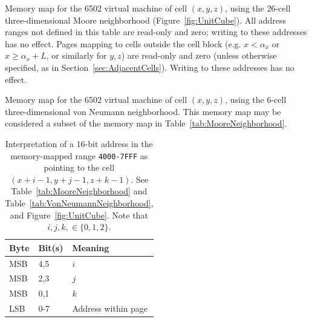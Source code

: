 \documentclass{article}
\newcommand\hex[1]{{\tt #1}}
\newcommand\hexrange[2]{\hex{#1}{\tt -}\hex{#2}}
\begin{document}
\begin{table}
\mooremap
\caption{
  \label{tab:MooreNeighborhood}
  Memory map for the 6502 virtual machine of cell $(x,y,z)$,
  using the 26-cell three-dimensional Moore neighborhood (Figure~\ref{fig:UnitCube}).
  All address ranges not defined in this table are read-only and zero;
  writing to these addresses has no effect.
  Pages mapping to cells outside the cell block (e.g. $x<\alpha_x$ or $x \geq \alpha_x+L$, or similarly for $y,z$)
  are read-only and zero (unless otherwise specified, as in Section~\ref{sec:AdjacentCells}).
  Writing to these addresses has no effect.
}
\end{table}

\begin{table}
\vonneumannmap
\caption{
  \label{tab:VonNeumannNeighborhood}
  Memory map for the 6502 virtual machine of cell $(x,y,z)$,
  using the 6-cell three-dimensional von Neumann neighborhood.
  This memory map may be considered a subset of the memory map in Table~\ref{tab:MooreNeighborhood}.
}
\end{table}

\begin{table}
\begin{tabular}{lll}
  \hline
  Byte & Bit(s) & Meaning \\
  \hline
  MSB & 4,5 & $i$ \\
  MSB & 2,3 & $j$ \\
  MSB & 0,1 & $k$ \\
  LSB & 0-7 & Address within page \\
  \hline
\end{tabular}
\caption{
  Interpretation of a 16-bit address in the memory-mapped range \hexrange{4000}{7FFF}
  as pointing to the cell $(x+i-1,y+j-1,z+k-1)$.
  See Table~\ref{tab:MooreNeighborhood} and Table~\ref{tab:VonNeumannNeighborhood}, and Figure~\ref{fig:UnitCube}.
  Note that $i,j,k, \in \{ 0,1,2 \}$.
  \label{tab:AddressBits}
}
\end{table}
\end{document}
